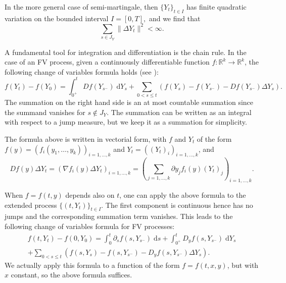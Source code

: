 \documentclass[reqno,12pt]{amsart}
\theoremstyle{plain} %
\theoremstyle{definition} %
\begin{document}
In the more general case of semi-martingale, then $\{Y_t\}_{t\in I}$ has finite quadratic variation \cite[Section II.6]{Protter2005} on the bounded interval $I=[0, T],$ and we find that
\[
    \sum_{s\in J_{Y}} \|\Delta Y_t\|^2 < \infty.
\]

A fundamental tool for integration and differentiation is the chain rule. In the case of an FV process, given a continuously differentiable function $f:\mathbb{R}^k \rightarrow \mathbb{R}^k$, the following change of variables formula holds (see \cite[Theorems II.31 and II.33]{Protter2005}):
\begin{equation}
    f(Y_t) - f(Y_0) = \int_{0^+}^t Df(Y_{s^-}) \;\mathrm{d}Y_s + \sum_{0 < s \leq t} \left( f(Y_s) - f(Y_{s^{-}}) - Df(Y_{s^-})\Delta Y_s\right).
\end{equation}
The summation on the right hand side is an at most countable summation since the summand vanishes for $s \notin J_{Y}$. The summation can be written as an integral with respect to a jump measure, but we keep it as a summation for simplicity.

The formula above is written in vectorial form, with $f$ and $Y_t$ of the form $f(y)=(f_i(y_1, \ldots, y_k))_{i=1, \ldots, k}$ and $Y_t = ((Y_t)_i)_{i=1, \ldots, k}$, and
\[
    Df(y)\Delta Y_t = \left( \nabla f_i(y)\Delta Y_t\right)_{i=1, \ldots, k} = \left( \sum_{j=1, \ldots, k} \partial y_j f_i(y) (Y_t)_j \right)_{i=1, \ldots, k}.
\]

When $f=f(t, y)$ depends also on $t$, one can apply the above formula to the extended process $\{(t, Y_t)\}_{t\in I}$. The first component is continuous hence has no jumps and the corresponding summation term vanishes. This leads to the following change of variables formula for FV processes:
\begin{multline}
    \label{changeofvariablesformulacadlagfv}
    f(t, Y_t) - f(0, Y_0) = \int_0^t \partial_s f(s, Y_{s^-})\;\mathrm{d}s + \int_{0^+}^t D_y f(s, Y_{s^-}) \;\mathrm{d}Y_s \\
    + \sum_{0 < s \leq t} \left( f(s, Y_s) - f(s, Y_{s^{-}}) - D_y f(s, Y_{s^-})\Delta Y_s\right).
\end{multline}
We actually apply this formula to a function of the form $f=f(t, x, y)$, but with $x$ constant, so the above formula suffices.
\end{document}
